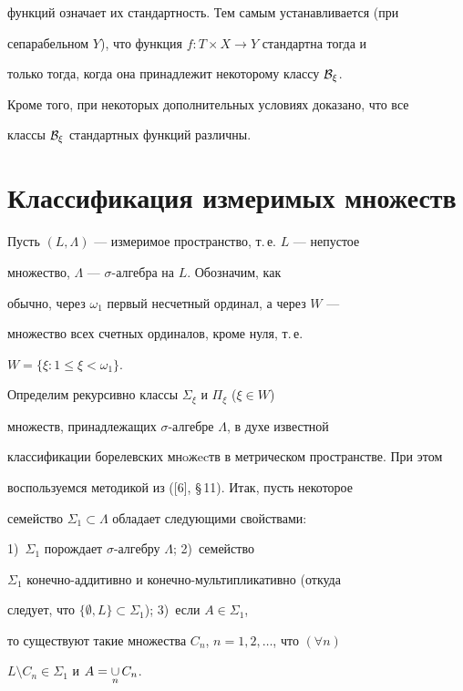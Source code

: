 функций означает их стандартность. Тем самым устанавливается (при 


сепарабельном $Y$), что функция $f:T\times X\to Y$ стандартна тогда и 


только тогда, когда она принадлежит некоторому классу $\cal B_\xi$. 


Кроме того, при некоторых дополнительных условиях доказано, что все 


классы $\cal B_\xi$ стандартных функций различны. 


 


\section{Классификация измеримых множеств} 


 


Пусть $(L,\Lambda)$ --- измеримое пространство, т.\,е. $L$ --- непустое 


множество, $\Lambda$ --- $\sigma$-алгебра на $L$. Обозначим, как 


обычно, через $\omega_1$ первый несчетный ординал, а через $W$ --- 


множество всех счетных ординалов, кроме нуля, т.\,е. 


$W=\{\xi:1\le\xi<\omega_1\}$. 


 


Определим рекурсивно классы $\Sigma_\xi$ и $\Pi_\xi$ ($\xi\in W$) 


множеств, принадлежащих $\sigma$-алгебре $\Lambda$, в духе известной 


классификации борелевских мнoжecтв в метрическом пространстве. При этом 


воспользуемся методикой из ([6], \S\,11). Итак, пусть некоторое 


семейство $\Sigma_1\subset\Lambda$ обладает следующими свойствами: 


1)~$\Sigma_1$ порождает $\sigma$-алгебру $\Lambda$; 2)~семейство 


$\Sigma_1$ конечно-аддитивно и конечно-мультипликативно (откуда 


следует, что $\{\emptyset,L\}\subset\Sigma_1$); 3)~если $A\in\Sigma_1$, 


то существуют такие множества $C_n$, $n=1,2,\dotsc$, что $(\forall n)$ 


$L\setminus C_n\in\Sigma_1$ и $A=\mathop{\cup}\limits_n C_n$. 


